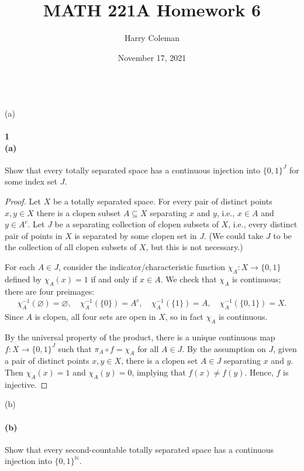 \documentclass[12pt]{article}
\renewcommand{\maketitle}{\thispagestyle{title}}
\newlength{\myparskip}
\newenvironment{fullbox}{\begin{lrbox}{\savefullbox}\begin{minipage}{\dimexpr\textwidth-2\fboxsep\relax}\setlength{\parskip}{\myparskip}}{\end{minipage}\end{lrbox}\framebox[\textwidth]{\usebox{\savefullbox}}}
\newenvironment{pbox}[1][]{\begin{fullbox}\ifx#1\empty\else\paragraph{#1}\fi}{\end{fullbox}}
\theoremstyle{definition}
\renewcommand{\emptyset}{\varnothing}
\newcommand{\<}{\langle}
\renewcommand{\>}{\rangle}
\begin{document}
\title{MATH 221A Homework 6}
\author{Harry Coleman}
\date{November 17, 2021}
\maketitle

\begin{pbox}[1 \\ (a)]
    Show that every totally separated space has a continuous injection into $\{0,1\}^J$ for some index set $J$.
\end{pbox}



\begin{proof}
    Let $X$ be a totally separated space.
    For every pair of distinct points $x, y \in X$ there is a clopen subset $A \subseteq X$ separating $x$ and $y$, i.e., $x \in A$ and $y \in A^c$.
    Let $J$ be a separating collection of clopen subsets of $X$, i.e., every distinct pair of points in $X$ is separated by some clopen set in $J$.
    (We could take $J$ to be the collection of all clopen subsets of $X$, but this is not necessary.) 

    For each $A \in J$, consider the indicator/characteristic function $\chi_A : X \to \{0, 1\}$ defined by $\chi_A(x) = 1$ if and only if $x \in A$.
    We check that $\chi_A$ is continuous; there are four preimages:
    \begin{align*}
        \chi_A^{-1}(\emptyset) = \emptyset, \quad
        \chi_A^{-1}(\{0\}) = A^c, \quad
        \chi_A^{-1}(\{1\}) = A, \quad
        \chi_A^{-1}(\{0, 1\}) = X.
    \end{align*}
    Since $A$ is clopen, all four sets are open in $X$, so in fact $\chi_A$ is continuous.

    By the universal property of the product, there is a unique continuous map $f : X \to \{0, 1\}^J$ such that $\pi_A \circ f = \chi_A$ for all $A \in J$.
    By the assumption on $J$, given a pair of distinct points $x, y \in X$, there is a clopen set $A \in J$ separating $x$ and $y$.
    Then $\chi_A(x) = 1$ and $\chi_A(y) = 0$, implying that $f(x) \ne f(y)$.
    Hence, $f$ is injective.
\end{proof}



\begin{pbox}[(b)]
    Show that every second-countable totally separated space has a continuous injection into $\{0,1\}^{\mathbb N}$.
\end{pbox}
\end{document}

